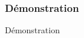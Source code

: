 \speaker{\Melissa}
\begin{frame}
	\frametitle{Démonstration}
	\begin{center}
		\begin{Large}
			Démonstration
		\end{Large}
	\end{center}
\end{frame}